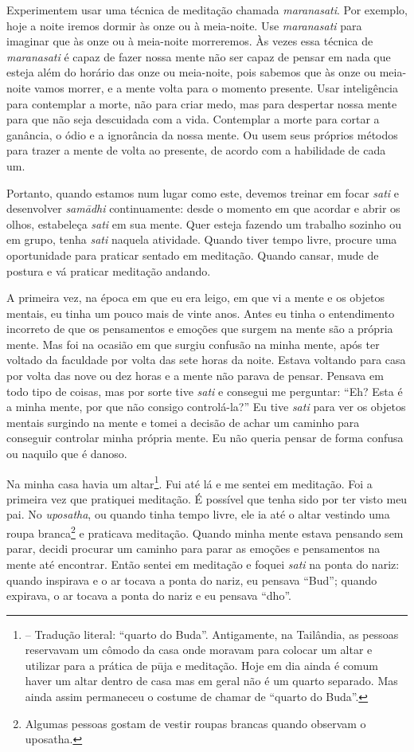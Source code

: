 Experimentem usar uma técnica de meditação chamada
\textit{maranasati}. Por exemplo, hoje a noite iremos dormir às onze ou
à meia-noite. Use \textit{maranasati }para imaginar que às onze ou à
meia-noite morreremos. Às vezes essa técnica de \textit{maranasati }é
capaz de fazer nossa mente não ser capaz de pensar em nada que esteja
além do horário das onze ou meia-noite, pois sabemos que às onze ou
meia-noite vamos morrer, e a mente volta para o momento presente. Usar
inteligência para contemplar a morte, não para criar medo, mas para
despertar nossa mente para que não seja descuidada com a vida.
Contemplar a morte para cortar a ganância, o ódio e a ignorância da
nossa mente. Ou usem seus próprios métodos para trazer a mente de volta
ao presente, de acordo com a habilidade de cada um.

Portanto, quando estamos num lugar como este, devemos treinar em
focar \textit{sati }e desenvolver \textit{samādhi }continuamente:
desde o momento em que acordar e abrir os olhos, estabeleça
\textit{sati }em sua mente. Quer esteja fazendo um trabalho sozinho ou
em grupo, tenha \textit{sati }naquela atividade. Quando tiver tempo
livre, procure uma oportunidade para praticar sentado em meditação.
Quando cansar, mude de postura e vá praticar meditação andando. 

A primeira vez, na época em que eu era leigo, em que vi a mente e os
objetos mentais, eu tinha um pouco mais de vinte anos. Antes eu tinha o
entendimento incorreto de que os pensamentos e emoções que surgem na
mente são a própria mente. Mas foi na ocasião em que surgiu confusão na
minha mente, após ter voltado da faculdade por volta das sete horas da
noite. Estava voltando para casa por volta das nove ou dez horas e a
mente não parava de pensar. Pensava em todo tipo de coisas, mas por
sorte tive \textit{sati }e consegui me perguntar: “Eh? Esta é a minha
mente, por que não consigo controlá-la?” Eu tive \textit{sati }para ver
os objetos mentais surgindo na mente e tomei a decisão de achar um
caminho para conseguir controlar minha própria mente. Eu não queria
pensar de forma confusa ou naquilo que é danoso.

Na minha casa havia um
altar\footnote{ – Tradução
literal: “quarto do Buda”. Antigamente, na Tailândia, as pessoas
reservavam um cômodo da casa onde moravam para colocar um altar e
utilizar para a prática de pūja e meditação. Hoje em dia ainda é
comum haver um altar dentro de casa mas em geral não é um quarto
separado. Mas ainda assim permaneceu o costume de chamar de “quarto do
Buda”.}. Fui até lá e me sentei em meditação. Foi a primeira vez que
pratiquei meditação. É possível que tenha sido por ter visto meu pai.
No \textit{uposatha}, ou quando tinha tempo livre, ele ia até o altar
vestindo uma roupa branca\footnote{Algumas pessoas gostam de vestir
roupas brancas quando observam o uposatha.} e praticava meditação.
Quando minha mente estava pensando sem parar, decidi procurar um
caminho para parar as emoções e pensamentos na mente até encontrar.
Então sentei em meditação e foquei \textit{sati }na ponta do nariz:
quando inspirava e o ar tocava a ponta do nariz, eu pensava “Bud”;
quando expirava, o ar tocava a ponta do nariz e eu pensava “dho”.

